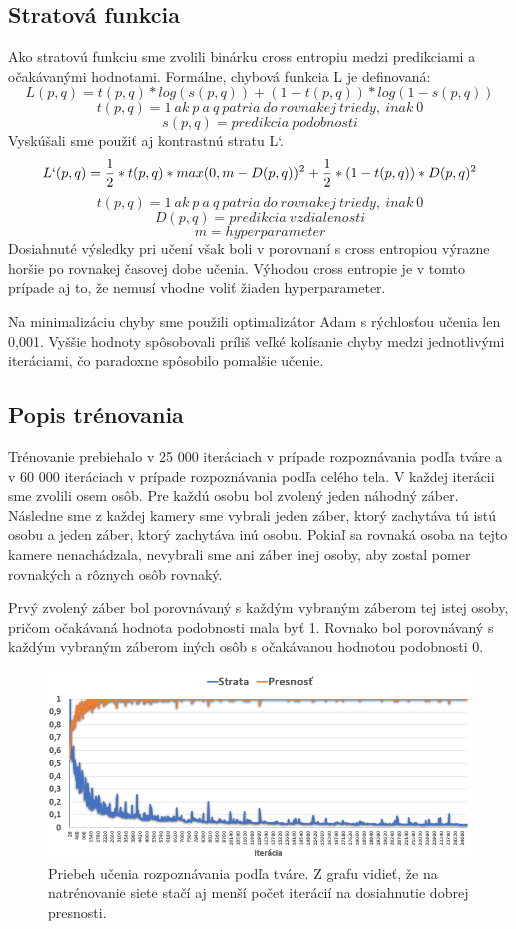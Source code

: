 \subsection{Stratová funkcia}
Ako stratovú funkciu sme zvolili binárku cross entropiu medzi predikciami a očakávanými hodnotami.
Formálne, chybová funkcia L je definovaná:
$$L(p, q) = t(p, q) * log(s(p, q)) + (1 - t(p, q)) * log(1 - s(p, q))$$
$$t(p, q) = 1\ ak\ p\ a\ q\ patria\ do\ rovnakej\ triedy,\ inak\ 0$$
$$s(p, q) = predikcia\ podobnosti$$
Vyskúšali sme použiť aj kontrastnú stratu L`.
$$L`(p, q) = \frac{1}{2} * t(p, q) * max(0, m - D(p, q))^2 + \frac{1}{2}*(1 - t(p, q)) * D(p, q)^2$$
$$t(p, q) = 1\ ak\ p\ a\ q\ patria\ do\ rovnakej\ triedy,\ inak\ 0$$
$$D(p, q) = predikcia\ vzdialenosti$$
$$m = hyperparameter$$
Dosiahnuté výsledky pri učení však boli v porovnaní s cross entropiou výrazne horšie po rovnakej časovej dobe učenia.
Výhodou cross entropie je v tomto prípade aj to, že nemusí vhodne voliť žiaden hyperparameter.

Na minimalizáciu chyby sme použili optimalizátor Adam s rýchlosťou učenia len 0,001.
Vyššie hodnoty spôsobovali príliš veľké kolísanie chyby medzi jednotlivými iteráciami, čo paradoxne spôsobilo pomalšie učenie.

\subsection{Popis trénovania}
Trénovanie prebiehalo v 25 000 iteráciach v prípade rozpoznávania podľa tváre a v 60 000 iteráciach v prípade rozpoznávania podľa celého tela.
V každej iterácii sme zvolili osem osôb.
Pre každú osobu bol zvolený jeden náhodný záber.
Následne sme z každej kamery sme vybrali jeden záber, ktorý zachytáva tú istú osobu a jeden záber, ktorý zachytáva inú osobu.
Pokiaľ sa rovnaká osoba na tejto kamere nenachádzala, nevybrali sme ani záber inej osoby, aby zostal pomer rovnakých a rôznych osôb rovnaký.

Prvý zvolený záber bol porovnávaný s každým vybraným záberom tej istej osoby, pričom očakávaná hodnota podobnosti mala byť 1.
Rovnako bol porovnávaný s každým vybraným záberom iných osôb s očakávanou hodnotou podobnosti 0.

\begin{figure}[H]
\centerline{\includegraphics[width=1\textwidth]{images/graph_learn_face.png}}
\caption[Priebeh učenia rozpoznávania podľa tváre]{Priebeh učenia rozpoznávania podľa tváre. Z grafu vidieť, že na natrénovanie siete stačí aj menší počet iterácií na dosiahnutie dobrej presnosti.}
\label{obr:graph_learn_face}
\end{figure}

